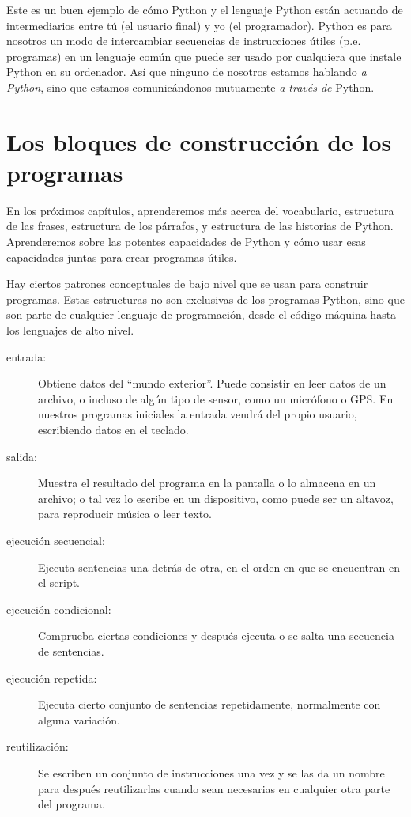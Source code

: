 Este es un buen ejemplo de cómo Python y el lenguaje Python están actuando de
intermediarios entre tú (el usuario final) y yo (el programador). Python es para nosotros
un modo de intercambiar secuencias de instrucciones útiles (p.e. programas) en un
lenguaje común que puede ser usado por cualquiera que instale
Python en su ordenador. Así que ninguno de nosotros estamos hablando {\em a Python},
sino que estamos comunicándonos mutuamente {\em a través de} Python.

\section{Los bloques de construcción de los programas}

En los próximos capítulos, aprenderemos más acerca del vocabulario, estructura de las
frases, estructura de los párrafos, y estructura de las historias de Python. Aprenderemos
sobre las potentes capacidades de Python y cómo usar esas capacidades juntas para crear
programas útiles.

Hay ciertos patrones conceptuales de bajo nivel que se usan para construir programas.
Estas estructuras no son exclusivas de los programas Python, sino que son parte de
cualquier lenguaje de programación, desde el código máquina hasta los lenguajes de alto
nivel.

\begin{description}

\item[entrada:] Obtiene datos del ``mundo exterior''. Puede consistir en
leer datos de un archivo, o incluso de algún tipo de sensor, como un micrófono
o GPS. En nuestros programas iniciales la entrada vendrá del propio usuario,
escribiendo datos en el teclado.

\item[salida:] Muestra el resultado del programa en la pantalla
o lo almacena en un archivo; o tal vez lo escribe en un dispositivo, como puede ser
un altavoz, para reproducir música o leer texto.

\item[ejecución secuencial:] Ejecuta sentencias una detrás de otra,
en el orden en que se encuentran en el script.

\item[ejecución condicional:] Comprueba ciertas condiciones y
después ejecuta o se salta una secuencia de sentencias.

\item[ejecución repetida:] Ejecuta cierto conjunto de sentencias
repetidamente, normalmente con alguna variación.

\item[reutilización:] Se escriben un conjunto de instrucciones una vez y se las da un nombre
para después reutilizarlas cuando sean necesarias en cualquier otra parte
del programa.

\end{description}

